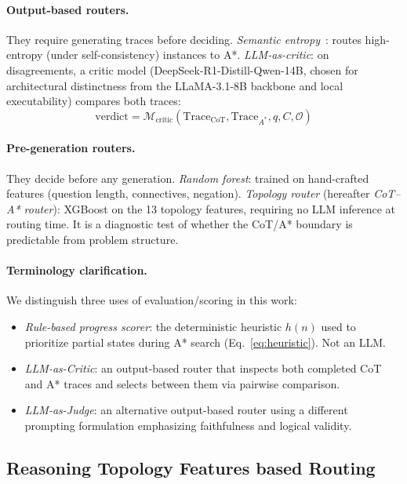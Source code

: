 \documentclass[11pt]{article}
\begin{document}
\paragraph{Output-based routers.} They require generating traces before deciding. \emph{Semantic entropy}~\citep{kossen2024semanticentropyprobesrobust}: routes high-entropy (under self-consistency) instances to A*. \emph{LLM-as-critic}: on disagreements, a critic model (DeepSeek-R1-Distill-Qwen-14B, chosen for architectural distinctness from the LLaMA-3.1-8B backbone and local executability) compares both traces:
\begin{equation}
\text{verdict} = \mathcal{M}_{\text{critic}}(\text{Trace}_{\text{CoT}}, \text{Trace}_{A^*}, q, C, \mathcal{O})
\label{eq:critic}
\end{equation}

\paragraph{Pre-generation routers.} They decide before any generation. \emph{Random forest}: trained on hand-crafted features (question length, connectives, negation). \emph{Topology router} (hereafter \emph{CoT--A* router}): XGBoost on the 13 topology features, requiring no LLM inference at routing time. It is a diagnostic test of whether the CoT/A* boundary is predictable from problem structure.

\paragraph{Terminology clarification.} We distinguish three uses of evaluation/scoring in this work:
\begin{itemize}[nosep,leftmargin=*]
\item \emph{Rule-based progress scorer}: the deterministic heuristic $h(n)$ used to prioritize partial states during A* search (Eq.~\ref{eq:heuristic}). Not an LLM.
\item \emph{LLM-as-Critic}: an output-based router that inspects both completed CoT and A* traces and selects between them via pairwise comparison.
\item \emph{LLM-as-Judge}: an alternative output-based router using a different prompting formulation emphasizing faithfulness and logical validity.
\end{itemize}


\subsection{Reasoning Topology Features based Routing}
\label{sec:topology_features}
\end{document}

